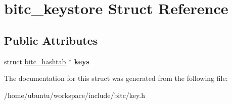 \hypertarget{structbitc__keystore}{\section{bitc\-\_\-keystore Struct Reference}
\label{structbitc__keystore}
}
\subsection*{Public Attributes}
\begin{DoxyCompactItemize}
\item 
\hypertarget{structbitc__keystore_a2f5665ee88398473b1baabc72cf09e72}{struct \hyperlink{structbitc__hashtab}{bitc\-\_\-hashtab} $\ast$ {\bfseries keys}}\label{structbitc__keystore_a2f5665ee88398473b1baabc72cf09e72}

\end{DoxyCompactItemize}


The documentation for this struct was generated from the following file\-:\begin{DoxyCompactItemize}
\item 
/home/ubuntu/workspace/include/bitc/key.\-h\end{DoxyCompactItemize}
